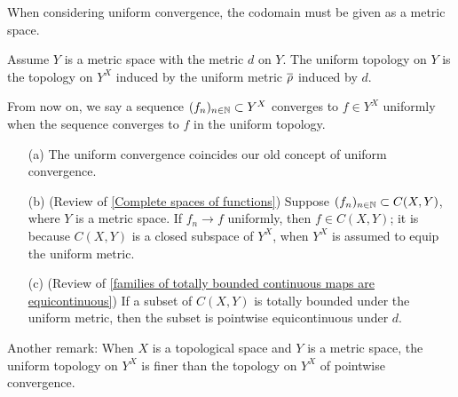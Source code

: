 When considering uniform convergence, the codomain must be given as a metric space.
\begin{defi}
    Assume $Y$ is a metric space with the metric $d$ on $Y$.
    The uniform topology on $Y$ is the topology on $Y^X$ induced by the uniform metric $\overline{\rho}$ induced by $d$.
\end{defi}
From now on, we say a sequence $(f_n)_{n\in{\mathbb{N}}}\subset Y^X$ converges to $f\in Y^X$ uniformly when the sequence converges to $f$ in the uniform topology.
\begin{rmk}
    \begin{enumerate}
        \item[(a)]
        {
            The uniform convergence coincides our old concept of uniform convergence.
        }
        \item[(b)]
        {
            (Review of \cref{Complete spaces of functions})
            Suppose $(f_n)_{n\in{\mathbb{N}}}\subset C(X, Y)$, where $Y$ is a metric space.
            If $f_n\rightarrow f$ uniformly, then $f\in C(X, Y)$; it is because $C(X, Y)$ is a closed subspace of $Y^X$, when $Y^X$ is assumed to equip the uniform metric.
        }
        \item[(c)]
        {
            (Review of \cref{families of totally bounded continuous maps are equicontinuous})
            If a subset of $C(X, Y)$ is totally bounded under the uniform metric, then the subset is pointwise equicontinuous under $d$.
        }
    \end{enumerate}
\end{rmk}
Another remark: When $X$ is a topological space and $Y$ is a metric space, the uniform topology on $Y^X$ is finer than the topology on $Y^X$ of pointwise convergence.

